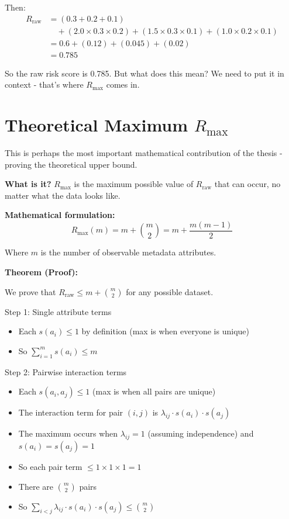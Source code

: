 \documentclass[12pt,a4paper,oneside,openany]{report}
\newcommand{\Rmax}{R_{\mathrm{max}}}
\begin{document}
Then:
\begin{align}
R_{\mathrm{raw}} &= (0.3 + 0.2 + 0.1) \\
&\quad + (2.0 \times 0.3 \times 0.2) + (1.5 \times 0.3 \times 0.1) + (1.0 \times 0.2 \times 0.1) \\
&= 0.6 + (0.12) + (0.045) + (0.02) \\
&= 0.785
\end{align}

So the raw risk score is 0.785. But what does this mean? We need to put it in context - that's where $R_{\mathrm{max}}$ comes in.

\section{Theoretical Maximum $R_{\mathrm{max}}$}
\label{sec:max}

This is perhaps the most important mathematical contribution of the thesis - proving the theoretical upper bound.

\textbf{What is it?} $R_{\mathrm{max}}$ is the maximum possible value of $R_{\mathrm{raw}}$ that can occur, no matter what the data looks like.

\textbf{Mathematical formulation:}
\begin{equation}
\Rmax(m) = m + \binom{m}{2} = m + \frac{m(m-1)}{2}
\end{equation}

Where $m$ is the number of observable metadata attributes.

\textbf{Theorem (Proof):}

We prove that $R_{\mathrm{raw}} \leq m + \binom{m}{2}$ for any possible dataset.

Step 1: Single attribute terms
\begin{itemize}
    \item Each $s(a_i) \leq 1$ by definition (max is when everyone is unique)
    \item So $\sum_{i=1}^{m} s(a_i) \leq m$
\end{itemize}

Step 2: Pairwise interaction terms
\begin{itemize}
    \item Each $s(a_i, a_j) \leq 1$ (max is when all pairs are unique)
    \item The interaction term for pair $(i,j)$ is $\lambda_{ij} \cdot s(a_i) \cdot s(a_j)$
    \item The maximum occurs when $\lambda_{ij} = 1$ (assuming independence) and $s(a_i) = s(a_j) = 1$
    \item So each pair term $\leq 1 \times 1 \times 1 = 1$
    \item There are $\binom{m}{2}$ pairs
    \item So $\sum_{i<j} \lambda_{ij} \cdot s(a_i) \cdot s(a_j) \leq \binom{m}{2}$
\end{itemize}
\end{document}
